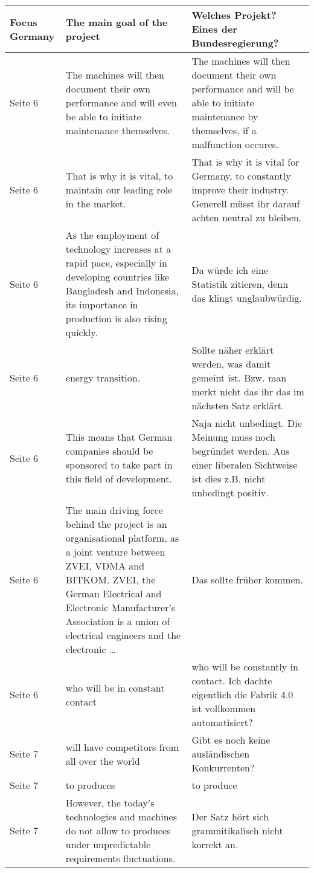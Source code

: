 \documentclass{article}
\begin{document}
\begin{tabularx}{\textwidth}{|l|X|X|}
    \hline
    Focus Germany & The main goal of the project & Welches Projekt? Eines der Bundesregierung?\\
    \hline
    Seite 6 & The machines will then document their own
performance and will even be able to initiate maintenance themselves. & The machines will then document their own
performance and will be able to initiate maintenance by themselves, if a malfunction occures.\\
    \hline
    Seite 6 & That is
    why it is vital, to maintain our leading role in the market. & That is
    why it is vital for Germany, to constantly improve their industry. Generell müsst ihr darauf achten neutral zu bleiben.\\
    \hline
    Seite 6 & As the employment of
    technology increases at a rapid pace, especially in developing countries like Bangladesh
    and Indonesia, its importance in production is also rising quickly. &
    Da würde ich eine Statistik zitieren, denn das klingt unglaubwürdig.\\
    \hline
    Seite 6 & energy transition.& Sollte näher erklärt werden, was damit gemeint ist. Bzw. man merkt nicht das ihr das im nächsten Satz erklärt.\\
    \hline
    Seite 6 & This means that German companies should be
    sponsored to take part in this field of development. & Naja nicht unbedingt. Die Meinung muss noch begründet werden. Aus einer liberalen Sichtweise ist dies z.B. nicht unbedingt positiv.\\
    \hline
    Seite 6 & The main driving force behind the project is an organisational platform, as a joint
    venture between ZVEI, VDMA and BITKOM. ZVEI, the German Electrical and Electronic
    Manufacturer’s Association is a union of electrical engineers and the electronic \ldots& Das sollte früher kommen.\\
    \hline
    Seite 6 & who will be in constant contact & who will be constantly in contact.
    Ich dachte eigentlich die Fabrik 4.0 ist vollkommen automatisiert?\\
    \hline
    Seite 7 & will have competitors
    from all over the world & Gibt es noch keine ausländischen Konkurrenten?\\
    \hline
    Seite 7 & to produces & to produce\\
    \hline
    Seite 7 & However, the
    today’s technologies and machines do not allow to produces under unpredictable
    requirements fluctuations. & Der Satz hört sich grammitikalisch nicht korrekt an.\\

\end{tabularx}
\end{document}
